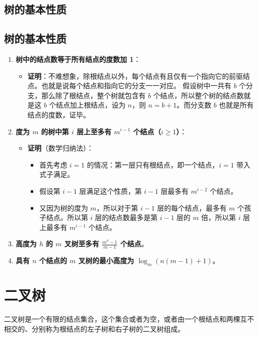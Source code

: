 \documentclass[lang=cn,newtx,10pt,scheme=chinese]{elegantbook}
\begin{document}
\subsection{树的基本性质}
\subsection{树的基本性质}

\begin{enumerate}
  \item \textbf{树中的结点数等于所有结点的度数加 1}：
  \begin{itemize}
    \item \textbf{证明}：不难想象，除根结点以外，每个结点有且仅有一个指向它的前驱结点。也就是说每个结点和指向它的分支一一对应。
    假设树中一共有 $b$ 个分支，那么除了根结点，整个树就包含有 $b$ 个结点，所以整个树的结点数就是这 $b$ 个结点加上根结点，设为 $n$，则 $n = b + 1$。而分支数 $b$ 也就是所有结点的度数，证毕。
  \end{itemize}

  \item \textbf{度为 $m$ 的树中第 $i$ 层上至多有 $m^{i-1}$ 个结点（$i \geq 1$）}：
  \begin{itemize}
    \item \textbf{证明}（数学归纳法）：
    \begin{itemize}
      \item 首先考虑 $i = 1$ 的情况：第一层只有根结点，即一个结点，$i = 1$ 带入式子满足。
      \item 假设第 $i-1$ 层满足这个性质，第 $i-1$ 层最多有 $m^{i-2}$ 个结点。
      \item 又因为树的度为 $m$，所以对于第 $i-1$ 层的每个结点，最多有 $m$ 个孩子结点。所以第 $i$ 层的结点数最多是第 $i-1$ 层的 $m$ 倍，所以第 $i$ 层上最多有 $m^{i-1}$ 个结点。
    \end{itemize}
  \end{itemize}

  \item \textbf{高度为 $h$ 的 $m$ 叉树至多有 $\frac{m^h - 1}{m - 1}$ 个结点}。

  \item \textbf{具有 $n$ 个结点的 $m$ 叉树的最小高度为 $\log_m(n(m-1)+1)$}。
\end{enumerate}


\section{二叉树}
二叉树是一个有限的结点集合，这个集合或者为空，或者由一个根结点和两棵互不相交的、分别称为根结点的左子树和右子树的二叉树组成。
\end{document}
